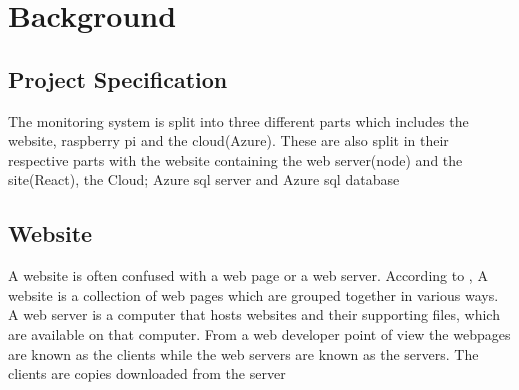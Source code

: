 
\chapter{Background}
\section*{Project Specification}
The monitoring system is split into three different parts which includes the website, raspberry pi and the cloud(Azure). These are also split in their respective parts with the website containing the web server(node) and the site(React), the Cloud; Azure sql server and Azure sql database
 
\section{Website}
A website is often confused with a web page or a web server. According to \cite{Whatisth32:online}, A website is a collection of web pages which are grouped together in various ways. A web server is a computer that hosts websites and their supporting files, which are available on that computer. From a web developer point of view the webpages are known as the clients while the web servers are known as the servers. The clients are copies downloaded from the server
 
 
